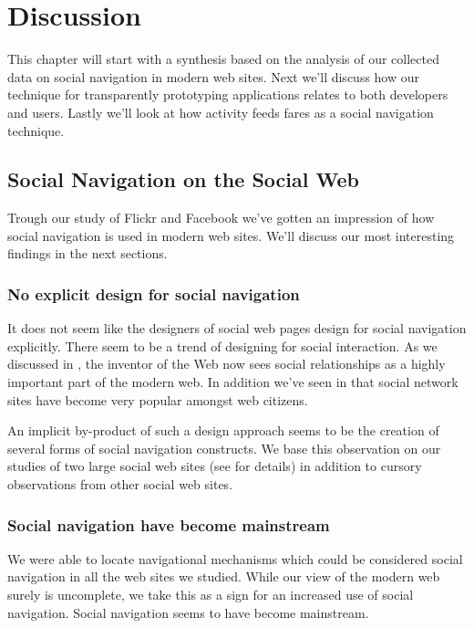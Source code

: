 \chapter{Discussion}
\label{chapter:discussion}

This chapter will start with a synthesis based on the analysis of our
collected data on social navigation in modern web sites.
Next we'll discuss how our technique for transparently prototyping
applications relates to both developers and users. Lastly we'll look at how
activity feeds fares as a social navigation technique.

\section{Social Navigation on the Social Web}

Trough our study of Flickr and Facebook we've gotten an impression of how
social navigation is used in modern web sites. We'll discuss our most
interesting findings in the next sections.

\subsection{No explicit design for social navigation}

It does not seem like the designers of social web pages design for social
navigation explicitly. There seem to be a trend of designing for social
interaction. As we discussed in
, the inventor of the Web
now sees social relationships as a highly important part of the modern web.
In addition we've seen in
that social network sites have become very popular amongst web citizens.

An implicit by-product of such a design approach seems to be
the creation of several forms of social navigation constructs.
We base this observation on our studies of two large social web sites
(see  for details)
in addition to cursory observations from other social web sites.

\subsection{Social navigation have become mainstream}

We were able to locate navigational mechanisms which could be considered
social navigation in all the web sites we studied. While our view of the
modern web surely is uncomplete, we take this as a sign for an increased use
of social navigation. Social navigation seems to have become mainstream.

